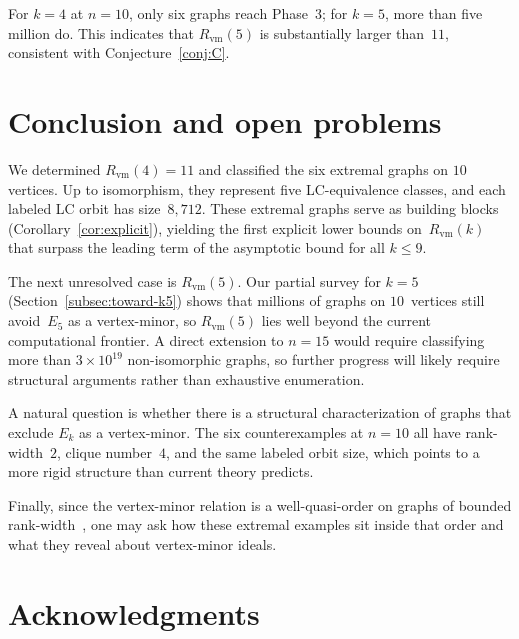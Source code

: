 \documentclass[11pt]{amsart}
\theoremstyle{definition}
\theoremstyle{remark}
\newcommand{\Rvm}{R_{\mathrm{vm}}}
\begin{document}
For $k=4$ at $n=10$, only six graphs reach Phase~3; for $k=5$, more
than five million do.  This indicates that $\Rvm(5)$ is substantially
larger than~$11$, consistent with Conjecture~\ref{conj:C}.


\section{Conclusion and open problems}\label{sec:conclusion}

We determined $\Rvm(4)=11$ and classified the six extremal graphs on
$10$ vertices.  Up to isomorphism, they represent five
LC-equivalence classes, and each labeled LC orbit has size~$8{,}712$.
These extremal graphs serve as building blocks
(Corollary~\ref{cor:explicit}), yielding the first explicit lower
bounds on~$\Rvm(k)$ that surpass the leading term of the asymptotic
bound for all $k\leq 9$.

The next unresolved case is $\Rvm(5)$.  Our partial survey for $k=5$
(Section~\ref{subsec:toward-k5}) shows that millions of graphs on
$10$~vertices still avoid~$E_5$ as a vertex-minor, so $\Rvm(5)$ lies
well beyond the current computational frontier.  A direct extension to
$n=15$ would require classifying more than $3\times 10^{19}$
non-isomorphic graphs, so further progress will likely require
structural arguments rather than exhaustive enumeration.

A natural question is whether there is a structural characterization of
graphs that exclude $E_k$ as a vertex-minor.  The six counterexamples at
$n=10$ all have rank-width~$2$, clique number~$4$, and the same labeled
orbit size, which points to a more rigid structure than current theory
predicts.

Finally, since the vertex-minor relation is a well-quasi-order on
graphs of bounded rank-width~\cite{Oum2008}, one may ask how these
extremal examples sit inside that order and what they reveal about
vertex-minor ideals.


\section*{Acknowledgments}
\end{document}
